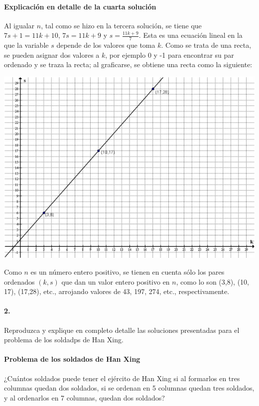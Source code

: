 \documentclass{article}
\begin{document}
	\paragraph{Explicación en detalle de la cuarta solución} Al igualar $n$, tal como se hizo en la tercera solución, se tiene que $7s+1=11k+10$, $7s=11k+9$ y $s=\frac{11k+9}{7}$. Esta es una ecuación lineal en la que la variable $s$ depende de los valores que toma $k$. Como se trata de una recta, se pueden asignar dos valores a $k$, por ejemplo 0 y -1 para encontrar su par ordenado y se traza la recta; al graficarse, se obtiene una recta como la siguiente:
	
	\begin{center}
		\includegraphics[scale=0.8]{Graf.PNG}
	\end{center}
	
	Como $n$ es un número entero positivo, se tienen en cuenta sólo los pares ordenados $(k,s)$ que dan un valor entero positivo en $n$, como lo son (3,8), (10, 17), (17,28), etc., arrojando valores de 43, 197, 274, etc., respectivamente.
	
	\paragraph{2.} Reproduzca y explique en completo detalle las soluciones presentadas para el problema de los soldadps de Han Xing.
	
	\paragraph{Problema de los soldados de Han Xing}¿Cuántos soldados puede tener el ejército de Han Xing si al formarlos en tres columnas quedan dos soldados, si se ordenan en 5 columnas quedan tres soldados, y al ordenarlos en 7 columnas, quedan dos soldados? 
	
\end{document}
